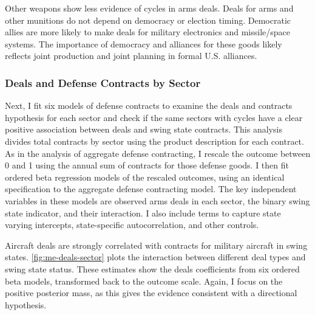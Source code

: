 \documentclass[12pt]{article}
\begin{document}
Other weapons show less evidence of cycles in arms deals. 
Deals for arms and other munitions do not depend on democracy or election timing. 
Democratic allies are more likely to make deals for military electronics and missile/space systems. 
The importance of democracy and alliances for these goods likely reflects joint production and joint planning in formal U.S. alliances. 



\subsubsection{Deals and Defense Contracts by Sector}

Next, I fit six models of defense contracts to examine the deals and contracts hypothesis for each sector and check if the same sectors with cycles have a clear positive association between deals and swing state contracts. 
This analysis divides total contracts by sector using the product description for each contract. 
As in the analysis of aggregate defense contracting, I rescale the outcome between 0 and 1 using the annual sum of contracts for those defense goods. 
I then fit ordered beta regression models of the rescaled outcomes, using an identical specification to the aggregate defense contracting model.
The key independent variables in these models are observed arms deals in each sector, the binary swing state indicator, and their interaction. 
I also include terms to capture state varying intercepts, state-specific autocorrelation, and other controls. 


Aircraft deals are strongly correlated with contracts for military aircraft in swing states. 
\autoref{fig:me-deals-sector} plots the interaction between different deal types and swing state status.  
These estimates show the deals coefficients from six ordered beta models, transformed back to the outcome scale. 
Again, I focus on the positive posterior mass, as this gives the evidence consistent with a directional hypothesis.
\end{document}
